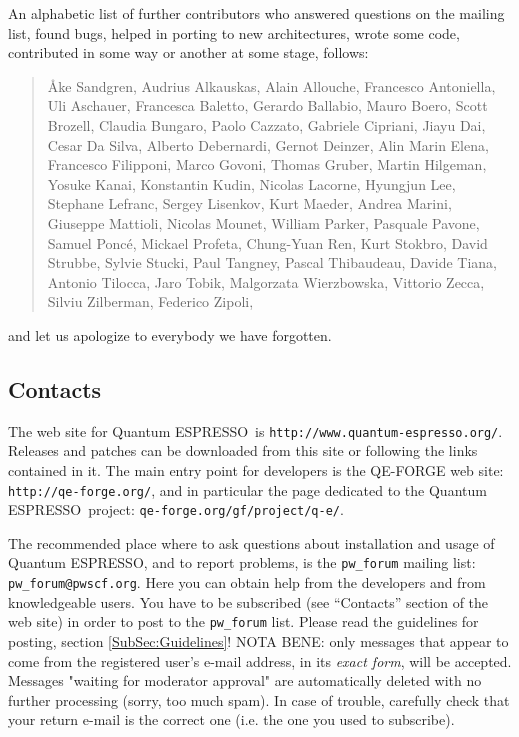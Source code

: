 \documentclass[12pt,a4paper]{article}
\def\qe{{\sc Quantum ESPRESSO}}
\begin{document}
An alphabetic list of further
contributors who answered questions on the mailing list, found
bugs, helped in porting to new architectures, wrote some code,
contributed in some way or another at some stage, follows:
\begin{quote}
  {\AA}ke Sandgren, Audrius Alkauskas, Alain Allouche, Francesco Antoniella,
  Uli Aschauer,  Francesca Baletto, Gerardo Ballabio, Mauro Boero,
  Scott Brozell, Claudia Bungaro, Paolo Cazzato, Gabriele Cipriani,
  Jiayu Dai, Cesar Da Silva, Alberto Debernardi, Gernot Deinzer,
  Alin Marin Elena, Francesco Filipponi, 
  Marco Govoni, Thomas Gruber, Martin Hilgeman, Yosuke Kanai, Konstantin Kudin,
  Nicolas Lacorne, Hyungjun Lee, Stephane Lefranc, Sergey Lisenkov, Kurt Maeder,
  Andrea Marini, Giuseppe Mattioli, Nicolas Mounet, William Parker,
  Pasquale Pavone, Samuel Ponc\'e, Mickael Profeta, Chung-Yuan Ren,
  Kurt Stokbro, David Strubbe, Sylvie Stucki, Paul Tangney, Pascal Thibaudeau,
  Davide Tiana, Antonio Tilocca, Jaro Tobik, Malgorzata Wierzbowska,
  Vittorio Zecca, Silviu Zilberman, Federico Zipoli,
\end{quote}
and let us apologize to everybody we have forgotten.

\subsection{Contacts}
\label{SubSec:Contacts}

The web site for \qe\ is \texttt{http://www.quantum-espresso.org/}.
Releases and patches can be downloaded from this
site or following the links contained in it. The main entry point for
developers is the QE-FORGE web site:
\texttt{http://qe-forge.org/}, and in particular the page dedicated to
the \qe\ project: \texttt{qe-forge.org/gf/project/q-e/}.

The recommended place where to ask questions about installation
and usage of \qe, and to report problems, is the \texttt{pw\_forum}
mailing list: \texttt{pw\_forum@pwscf.org}.
Here you can obtain help from the developers and from
knowledgeable users. You have to be subscribed (see ``Contacts''
section of the web site) in order to post to the  \texttt{pw\_forum}
list. Please read the guidelines for posting, section \ref{SubSec:Guidelines}!
NOTA BENE: only messages that appear to come from the
registered user's e-mail address, in its {\em exact form}, will be
accepted. Messages "waiting for moderator approval" are
automatically deleted with no further processing (sorry, too
much spam). In case of trouble, carefully check that your return
e-mail is the correct one (i.e. the one you used to subscribe).
\end{document}

